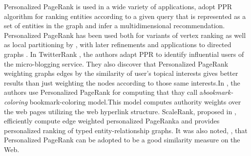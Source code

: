 \documentclass[11pt,oneside]{book}
\begin{document}
Personalized PageRank is used in a wide variety of applications, \citep{lee2011random} adopt PPR algorithm for ranking entities according to a given query that is represented as a set of entities in the graph and infer a multidimensional recommendation. Personalized PageRank has been used both for variants of vertex ranking as well as local partitioning by \citep{andersen2006local}, with later refinements \citep{andersen2007detecting} and applications to directed graphs \citep{andersen2007local}. In TwitterRank \citep{weng2010twitterrank}, the authors adapt PPR to identify influential users of the micro-blogging service. They also discover that Personalized PageRank weighting graphs edges by the similarity of user’s topical interests gives better results than just weighting the nodes according to those same interests.In \citep{berkhin2006bookmark}, the authors use Personalized PageRank for computing that thay call a\textit{bookmark-coloring} bookmark-coloring model.This model computes authority weights over the web pages utilizing the web hyperlink structure. ScaleRank, proposed in \citep{hristidis2014efficient}, efficiently compute edge weighted
personalized PageRanka and provides personalized ranking of typed entity-relationship graphs. It was also noted, \citep{sarkar2008fast}, that Personalized PageRank can be adopted to be a good similarity measure on the Web.\\

\end{document}
